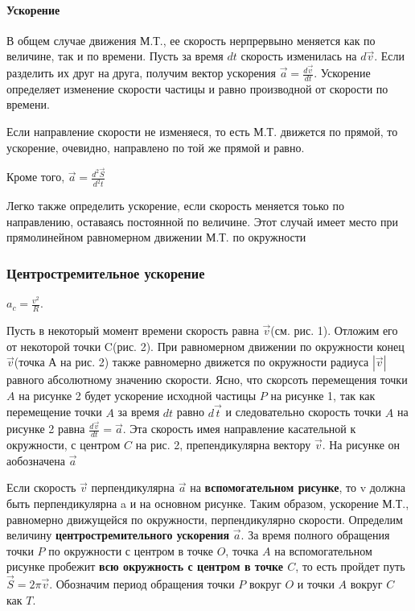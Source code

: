 \documentclass{article}
\begin{document}
\paragraph{Ускорение}
В общем случае движения М.Т., ее скорость нерпрервыно меняется как по величине, так и по времени. Пусть за время $dt$ скорость изменилась на $d\vec{v}$. Если разделить их друг на друга, получим вектор ускорения $\vec{a} = \frac{d\vec{v}}{dt}$. Ускорение определяет изменение скорости частицы и равно производной от скорости по времени.

Если направление скорости не изменяеся, то есть М.Т. движется по прямой, то ускорение, очевидно, направлено по той же прямой и равно.

Кроме того, $\vec{a} = \frac{d^2\vec{S}}{d^2t}$

Легко также определить ускорение, если скорость меняется тоько по направлению, оставаясь постоянной по величине. Этот случай имеет место при прямолинейном равномерном движении М.Т. по окружности

\subsubsection{Центростремительное ускорение} $a_c = \frac{v^2}{R}$.

Пусть в некоторый момент времени скорость равна $\vec{v}$(см. рис. 1). Отложим его от некоторой точки C(рис. 2). При равномерном движении по окружности конец $\vec{v}$(точка А на рис. 2) также равномерно движется по окружности радиуса $|\vec{v}|$ равного абсолютному значению скорости. Ясно, что скорсоть перемещения точки $A$ на рисунке 2 будет ускорение исходной частицы $P$ на рисунке 1, так как перемещение точки $A$ за время $dt$ равно $d\vec{t}$ и следовательно скорость точки $A$ на рисунке 2 равна $\frac{d\vec{v}}{dt} = \vec{a}$. Эта скорость имея направление касательной к окружности, с центром $C$ на рис. 2, препендикулярна вектору $\vec{v}$. На рисунке он аобозначена $\vec{a}$

Если скорость $\vec{v}$ перпендикулярна $\vec{a}$ на \textbf{вспомогательном рисунке}, то v должна быть перпендикулярна a и на основном рисунке. Таким образом, ускорение М.Т., равномерно движущейся по окружности, перпендикулярно скорости. Определим величину \textbf{центростремительного ускорения} $\vec{a}$. За время полного обращения точки $P$ по окружности с центром в точке $O$, точка $A$ на вспомогательном рисунке пробежит \textbf{всю окружность с центром в точке $C$}, то есть пройдет путь $\vec{S} = 2 \pi \vec{v}$. Обозначим период обращения точки $P$ вокруг $O$ и точки $A$ вокруг $C$ как $T$.
\end{document}
